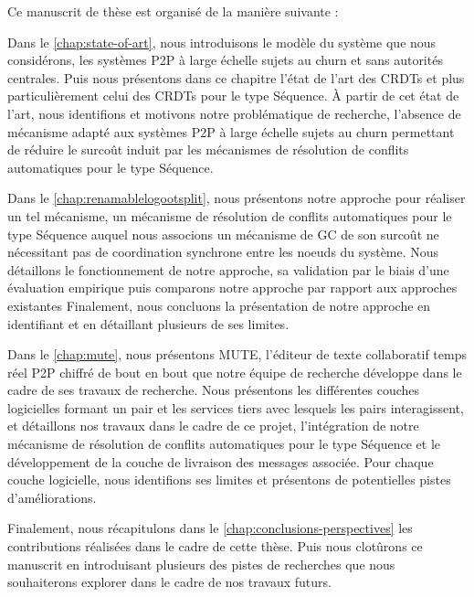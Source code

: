
Ce manuscrit de thèse est organisé de la manière suivante :

Dans le \autoref{chap:state-of-art}, nous introduisons le modèle du système que nous considérons, \ie les systèmes \ac{P2P} à large échelle sujets au churn et sans autorités centrales.
Puis nous présentons dans ce chapitre l'état de l'art des \acp{CRDT} et plus particulièrement celui des \acp{CRDT} pour le type Séquence.
À partir de cet état de l'art, nous identifions et motivons notre problématique de recherche, \ie l'absence de mécanisme adapté aux systèmes \ac{P2P} à large échelle sujets au churn permettant de réduire le surcoût induit par les mécanismes de résolution de conflits automatiques pour le type Séquence.

Dans le \autoref{chap:renamablelogootsplit}, nous présentons notre approche pour réaliser un tel mécanisme, \ie un mécanisme de résolution de conflits automatiques pour le type Séquence auquel nous associons un mécanisme de \acf{GC} de son surcoût ne nécessitant pas de coordination synchrone entre les noeuds du système.
Nous détaillons le fonctionnement de notre approche, sa validation par le biais d'une évaluation empirique puis comparons notre approche par rapport aux approches existantes
Finalement, nous concluons la présentation de notre approche en identifiant et en détaillant plusieurs de ses limites.

Dans le \autoref{chap:mute}, nous présentons \ac{MUTE}, l'éditeur de texte collaboratif temps réel \ac{P2P} chiffré de bout en bout que notre équipe de recherche développe dans le cadre de ses travaux de recherche.
Nous présentons les différentes couches logicielles formant un pair et les services tiers avec lesquels les pairs interagissent, et détaillons nos travaux dans le cadre de ce projet, \ie l'intégration de notre mécanisme de résolution de conflits automatiques pour le type Séquence et le développement de la couche de livraison des messages associée.
Pour chaque couche logicielle, nous identifions ses limites et présentons de potentielles pistes d'améliorations.

Finalement, nous récapitulons dans le \autoref{chap:conclusions-perspectives} les contributions réalisées dans le cadre de cette thèse.
Puis nous clotûrons ce manuscrit en introduisant plusieurs des pistes de recherches que nous souhaiterons explorer dans le cadre de nos travaux futurs.
